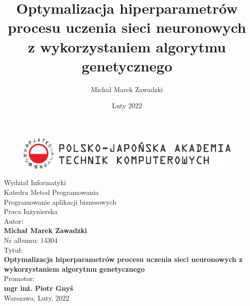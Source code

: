 \documentclass[a4paper,12pt]{article}
\title{Optymalizacja hiperparametrów procesu uczenia sieci neuronowych z wykorzystaniem algorytmu genetycznego}
\author{Michał Marek Zawadzki}
\date{Luty 2022}
\numberwithin{figure}{section}
\begin{document}
    \thispagestyle{empty}

    \begin{figure}[H]
        \label{fig:pjatk_logo}
        \centering
        \includegraphics[width=\textwidth]{pjatk_logo}
    \end{figure}

    \begin{center}

        \vspace{0.5cm}
        \large
        Wydział Informatyki \\

        \vspace{0.2cm}
        \large
        Katedra Metod Programowania \\

        \vspace{0.2cm}
        \large
        Programowanie aplikacji biznesowych \\

        \vspace{1cm}
        \LARGE
        Praca Inżynierska \\

        \vspace{1.2cm}
        \normalsize
        Autor: \\
        \vspace{.3cm}
        \large
        \textbf{Michał Marek Zawadzki} \\
        Nr albumu: 14304 \\

        \vspace{1.2cm}
        \normalsize
        Tytuł: \\
        \vspace{.3cm}
        \LARGE
        \textbf{Optymalizacja hiperparametrów procesu uczenia sieci neuronowych z wykorzystaniem algorytmu genetycznego} \\

        \vspace{1.2cm}
        \normalsize
        Promotor: \\
        \vspace{.3cm}
        \large
        \textbf{mgr inż. Piotr Gnyś} \\

        \vspace{1.6cm}
        \normalsize
        Warszawa, Luty, 2022 \\

    \end{center}
\end{document}
